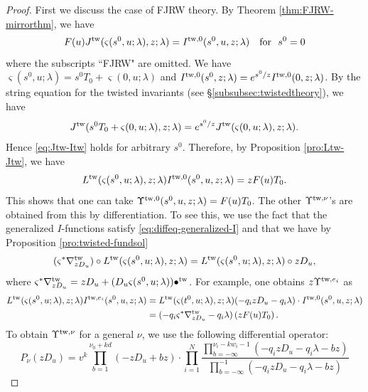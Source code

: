 \documentclass[11pt]{amsart}
\theoremstyle{definition} %
\theoremstyle{remark} %
\newcommand{\tw}{{\rm tw}}
\begin{document}
\begin{proof} 
First we discuss the case of FJRW theory. 
By Theorem \ref{thm:FJRW-mirrorthm}, we have 
\begin{equation} 
\label{eq:Jtw-Itw} 
F(u) J^{\tw}
(\varsigma(s^0, u;\lambda),z;\lambda ) = I^{\tw, 0}(s^0, u, z;\lambda) 
\quad \text{for } \ 
s^0 = 0 
\end{equation} 
where the subscripts ``FJRW" are omitted. 
We have $
\varsigma(s^0,u;\lambda) = s^0 T_0 + 
\varsigma(0,u;\lambda)$ and 
$I^{\tw,0}(s^0, z;\lambda) = e^{s^0/z} I^{\tw,0}(0,z;\lambda)$. 
By the string equation for the twisted invariants 
(see \S \ref{subsubsec:twistedtheory}), 
we have 
\[
J^{\tw}(s^0 T_0 + \varsigma(0, u;\lambda), z;\lambda) 
= e^{s^0/z} J^{\tw}(\varsigma(0, u;\lambda),z;\lambda). 
\]
Hence \eqref{eq:Jtw-Itw} holds for arbitrary $s^0$. 
Therefore, by Proposition \ref{pro:Ltw-Jtw}, we have 
\begin{equation} 
\label{eq:Upsilon0}
L^\tw(\varsigma(s^0,u;\lambda),z;\lambda) I^{\tw,0}(s^0,u,z;\lambda) 
= z F(u) T_0. 
\end{equation} 
This shows that one can take 
$\Upsilon^{\tw,0}(s^0,u,z;\lambda) = F(u) T_0$. 
The other $\Upsilon^{\tw,\nu}$'s are obtained from 
this by differentiation. 
To see this, we use the fact that the generalized 
$I$-functions satisfy \eqref{eq:diffeq-generalized-I} 
and that we have by Proposition \ref{pro:twisted-fundsol} 
\begin{equation*} 
(\varsigma^*\nabla^{\tw}_{z D_u}) \circ  
L^\tw(\varsigma(s^0,u;\lambda),z;\lambda) = 
L^\tw(\varsigma(s^0,u;\lambda),z;\lambda) \circ z D_u, 
\end{equation*} 
where $\varsigma^* \nabla^\tw_{zD_u} = zD_u + 
(D_u \varsigma(s^0,u;\lambda)) \bullet^\tw$. 
For example, one obtains $z \Upsilon^{\tw,e_i}$ as 
\begin{align*} 
L^\tw(\varsigma(s^0,u;\lambda),z;\lambda) I^{\tw,e_i}(s^0,u,z;\lambda) 
& = L^\tw (\varsigma(t^0,u;\lambda),z;\lambda)  (-q_i z D_u - q_i \lambda) \cdot 
I^{\tw,0}(s^0,u,z;\lambda) \\
& = (-q_i \varsigma^* \nabla^{\tw}_{z D_u}-q_i\lambda) \left( 
z F(u) T_0 \right).  
\end{align*} 
To obtain $\Upsilon^{\tw, \nu}$ for a general $\nu$, 
we use the following differential 
operator: 
\[
P_\nu(zD_u) = v^{k} 
\prod_{b=1}^{\nu_0 + kd} (- zD_u + bz) 
\cdot 
\prod_{i=1}^N 
\frac{
\prod_{b=-\infty}^{\nu_i - k w_i -1}(-q_i z D_u - q_i \lambda - b z) } 
{\prod_{b=-\infty}^{-1} (-q_i z D_u - q_i \lambda - b z) } 
\]
\end{proof}
\end{document}
